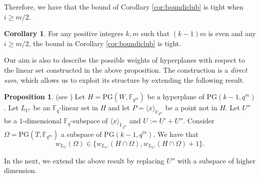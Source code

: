 \documentclass[11pt]{amsart}
\theoremstyle{definition}
\newtheorem{corollary}[theorem]{Corollary}
\newtheorem{proposition}[theorem]{Proposition}
\newcommand{\F}{{\mathbb F}}
\newcommand{\fq}{{\mathbb F}_{q}}
\newcommand{\PG}{\mathrm{PG}}
\newcommand{\fqm}{\mathbb{F}_{q^m}}
\begin{document}
Therefore, we have that the bound of Corollary \ref{cor:boundiclub} is tight when $i\geq m/2$.

\begin{corollary}
    For any positive integers $k,m$ such that $(k-1)m$ is even and any $i\geq m/2$, the bound in Corollary \ref{cor:boundiclub} is tight.
\end{corollary}
 

Our aim is also to describe the possible weights of hyperplanes with respect to the linear set constructed in the above proposition. The construction is a \emph{direct sum}, which allows us to exploit its structure by extending the following result.



\begin{proposition} \label{prop:weightbyintersectioninfinityind}(see \cite[Proposition 3.2]{AMSZ23})
Let $H=\PG(W,\fqm)$ be a hyperplane of $\mathrm{PG}(k-1,q^m)$. Let $L_{U'}$ be an $\fq$-linear set in $H$ and let $P =\langle x\rangle_{\mathbb{F}_{q^m}}$ be a point not in $H$.
Let $U''$ be a $1$-dimensional $\fq$-subspace of $\langle x\rangle_{\mathbb{F}_{q^m}}$ and  $U:=U'+U''$.
Consider $\Omega=\PG(T,\F_{q^m})$ a subspace of $\PG(k-1,q^m)$.
We have that
\[ w_{L_U}(\Omega) \in \{w_{L_{U'}}(H\cap \Omega),w_{L_{U'}}(H\cap \Omega)+1\}. \]
\end{proposition}

In the next, we extend the above result by replacing $U''$ with a subspace of higher dimension.
\end{document}
